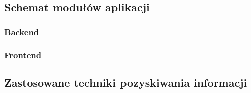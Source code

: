 \subsection{Schemat modułów aplikacji}
\subsubsection{Backend}

\subsubsection{Frontend}


\subsection{Zastosowane techniki pozyskiwania informacji}
